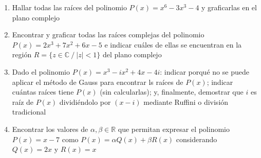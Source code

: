 \documentclass[a4paper]{article}
\begin{document}
\begin{enumerate}
\begin{enumerate} [label=(\alph*)]
		\item Hallar todas las raíces del polinomio $P(x)=x^6-3x^3-4$ y graficarlas en el plano complejo

		\item Encontrar y graficar todas las raíces complejas del polinomio $P(x)=2x^3+7x^2+6x-5$ e indicar cuáles de ellas se encuentran en la región $R=\{ z \in \mathbb{C} ~/~ |z|<1 \}$ del plano complejo

		\item Dado el polinomio $P(x)=x^3-ix^2+4x-4i$: indicar porqué no se puede aplicar el método de Gauss para encontrar ls raíces de $P(x)$; indicar cuántas raíces tiene $P(x)$ (sin calcularlas); y, finalmente, demostrar que $i$ es raíz de $P(x)$ dividiéndolo por $(x-i)$ mediante Ruffini o división tradicional

		\item Encontrar los valores de $\alpha, \beta \in \mathbb{R}$ que permitan expresar el polinomio $P(x)=x-7$ como $P(x)=\alpha Q(x)+\beta R(x)$ considerando $Q(x)=2x$ y $R(x)=x$

	\end{enumerate}


\end{enumerate}
\end{document}

